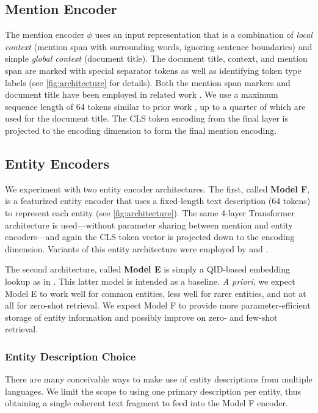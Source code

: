 \documentclass[11pt,a4paper]{article}
\begin{document}
\subsection{Mention Encoder}
The mention encoder $\phi$ uses an  input representation that is a combination of \emph{local context} (mention span with surrounding words, ignoring sentence boundaries) and simple \emph{global context} (document title). The document title, context, and mention span are marked with special separator tokens as well as identifying token type labels (see \autoref{fig:architecture} for details). Both the mention span markers and document title have been employed in related work \citep{agarwal2020entity,fevry2020empirical}.  We use a maximum sequence length of 64 tokens similar to prior work \citep{fevry2020empirical}, up to a quarter of which are used for the document title. The CLS token encoding from the final layer is projected to the encoding dimension to form the final mention encoding.

\subsection{Entity Encoders}
We experiment with two entity encoder architectures. The first, called \textbf{Model F}, is a featurized entity encoder that uses a fixed-length text description (64 tokens) to represent each entity (see \autoref{fig:architecture}). The same 4-layer Transformer architecture is used---without parameter sharing between mention and entity encoders---and again the CLS token vector is projected down to the encoding dimension. Variants of this entity architecture were employed by  and .

The second architecture, called \textbf{Model E} is simply a QID-based embedding lookup as in .
This latter model is intended as a baseline. \emph{A priori}, we expect Model E to work well for common entities, less well for rarer entities, and not at all for zero-shot retrieval. We expect Model F to provide more parameter-efficient storage of entity information and possibly improve on zero- and few-shot retrieval. 


\subsubsection{Entity Description Choice}\label{sec:description_heuristic}
There are many conceivable ways to make use of entity descriptions from multiple languages.
We limit the scope to using one primary description per entity, thus obtaining a single coherent text fragment to feed into the Model F encoder.
\end{document}
